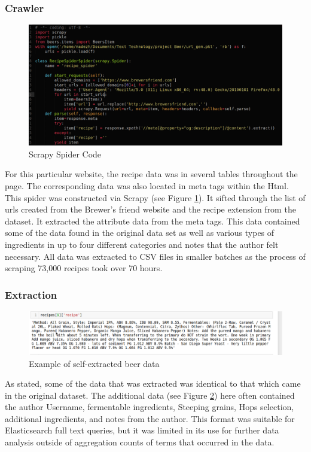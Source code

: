 \documentclass[bibliography=totoc]{article}
\begin{document}
 \subsubsection{Crawler}
 \begin{figure}
    \includegraphics[height=0.5\textwidth]{beer_crawler.png}
    \caption{\label{beer_crawler}Scrapy Spider Code} 
 \end{figure}
 For this particular website, the recipe data was in several tables 
 throughout the page. The corresponding data was also located 
 in meta tags within the Html. This spider was constructed via 
 Scrapy (see Figure \ref{beer_crawler}). It sifted through the list of urls created from the 
 Brewer’s friend website and the recipe extension from the 
 dataset. It extracted the attribute data from the meta tags. 
 This data contained some of the data found in the original data 
 set as well as various types of ingredients in up to four different 
 categories and notes that the author felt necessary. 
 All data was extracted to CSV files in smaller batches as the 
 process of scraping 73,000 recipes took over 70 hours.   

 \subsubsection{Extraction}
 \begin{figure}
    \includegraphics[height=0.2\textwidth]{beer_extraction.png}
    \caption{\label{beer_extraction}Example of self-extracted beer data} 
 \end{figure}
 As stated, some of the data that was extracted was identical to 
 that which came in the original dataset. 
 The additional data (see Figure \ref{beer_extraction}) here often contained the author Username, 
 fermentable ingredients, Steeping grains, Hops selection, 
 additional ingredients, and notes from the author. 
 This format was suitable for Elasticsearch full text queries, 
 but it was limited in its use for further data analysis outside of 
 aggregation counts of terms that occurred in the data.
\end{document}
